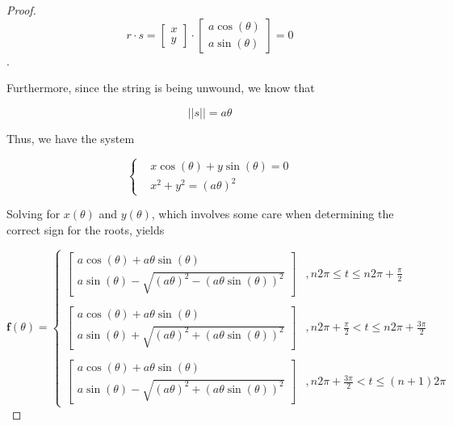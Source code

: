 \begin{exercise}
\begin{proof}
        \[ r \cdot s = \begin{bmatrix} x \\ y \end{bmatrix} \cdot \begin{bmatrix} a \cos(\theta) \\ a\sin(\theta) \end{bmatrix} = 0 \]. 
        
        Furthermore, since the string is being unwound, we know that 
        
        \[ \vert \vert s \vert \vert = a \theta \]
        
        Thus, we have the system
        
        \[
        \begin{cases}
            &x\cos(\theta) + y\sin(\theta) = 0 \\
            &x^2 + y^2 = (a\theta)^2
        \end{cases}
        \]
        
        Solving for \( x(\theta) \) and \( y(\theta) \), which involves some care when determining the correct sign for the roots, yields
        
        \[
        \mathbf{f}(\theta) = 
        \begin{cases}
            \begin{bmatrix} a\cos(\theta) + a\theta\sin(\theta) \\
            a\sin(\theta) - \sqrt{(a\theta)^2-(a\theta\sin(\theta))^2} \end{bmatrix} &, n2\pi \leq t \leq n2\pi + \frac{\pi}{2} \\
            \\
            \begin{bmatrix} a\cos(\theta) + a\theta\sin(\theta) \\
            a\sin(\theta) + \sqrt{(a\theta)^2+(a\theta\sin(\theta))^2} \end{bmatrix} &, n2\pi + \frac{\pi}{2} < t \leq n2\pi + \frac{3\pi}{2} \\
            \\
            \begin{bmatrix} a\cos(\theta) + a\theta\sin(\theta) \\
            a\sin(\theta) - \sqrt{(a\theta)^2+(a\theta\sin(\theta))^2} \end{bmatrix} &, n2\pi + \frac{3\pi}{2} < t \leq (n+1)2\pi
        \end{cases}
        \]


\end{proof}
\end{exercise}
